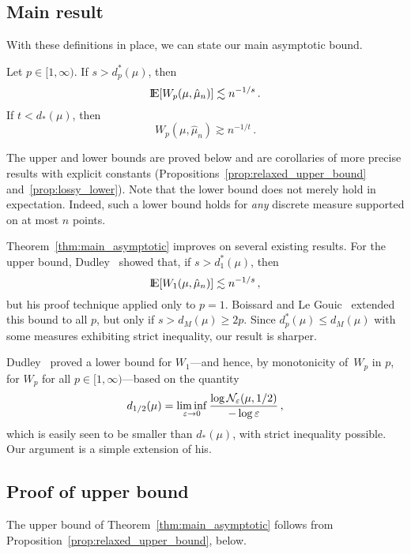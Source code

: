 \documentclass[sts]{imsart}
\newcommand*{\ep}{\varepsilon}
\begin{document}
\subsection{Main result}
With these definitions in place, we can state our main asymptotic bound.
\begin{theorem}\label{thm:main_asymptotic}
Let $p \in [1, \infty)$.
If $s > d_p^*(\mu)$, then
\begin{equation*}
{\rm I}\kern-0.18em{\rm E}[W_p(\mu, \hat \mu_n)] \lesssim n^{-1/s}\,.
\end{equation*}
If $t < d_*(\mu)$, then
\begin{equation*}
W_p(\mu, \hat \mu_n) \gtrsim n^{-1/t}\,.
\end{equation*}
\end{theorem}
The upper and lower bounds are proved below and are corollaries of more precise results with explicit constants (Propositions~\ref{prop:relaxed_upper_bound} and~\ref{prop:lossy_lower}).
Note that the lower bound does not merely hold in expectation.
Indeed, such a lower bound holds for \emph{any} discrete measure supported on at most $n$ points.

Theorem~\ref{thm:main_asymptotic} improves on several existing results.
For the upper bound, Dudley~\cite{Dud68} showed that, if $s > d_1^*(\mu)$, then
\begin{equation*}
{\rm I}\kern-0.18em{\rm E}[W_1(\mu, \hat \mu_n)] \lesssim n^{-1/s}\,,
\end{equation*}
but his proof technique applied only to $p = 1$.
Boissard and Le Gouic~\cite{BoiLeg14} extended this bound to all $p$, but only if $s > d_M(\mu) \geq 2p$.
Since $d^*_p(\mu) \leq d_M(\mu)$ with some measures exhibiting strict inequality, our result is sharper.

Dudley~\cite{Dud68} proved a lower bound for $W_1$---and hence, by monotonicity of~$W_p$ in $p$, for $W_p$ for all $p \in [1, \infty)$---based on the quantity
\begin{equation*}
d_{1/2}(\mu) = \liminf_{\ep \to 0} \frac{\log \cN_\ep(\mu, 1/2)}{- \log \ep}\,,
\end{equation*}
which is easily seen to be smaller than $d_*(\mu)$, with strict inequality possible.
Our argument is a simple extension of his.


\subsection{Proof of upper bound}
The upper bound of Theorem~\ref{thm:main_asymptotic} follows from Proposition~\ref{prop:relaxed_upper_bound}, below.
\end{document}
